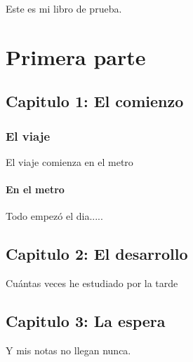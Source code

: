\documentclass[10pt,a4paper]{book}
\begin{document}
Este es mi libro de prueba.
\part{Primera parte}
\chapter{Capitulo 1: El comienzo}
\section{El viaje}
El viaje comienza en el metro
\subsection{En el metro}
Todo empezó el dia.....
\chapter{Capitulo 2: El desarrollo}
Cuántas veces he estudiado por la tarde
\chapter{Capitulo 3: La espera}
Y mis notas no llegan nunca. 
\end{document}

